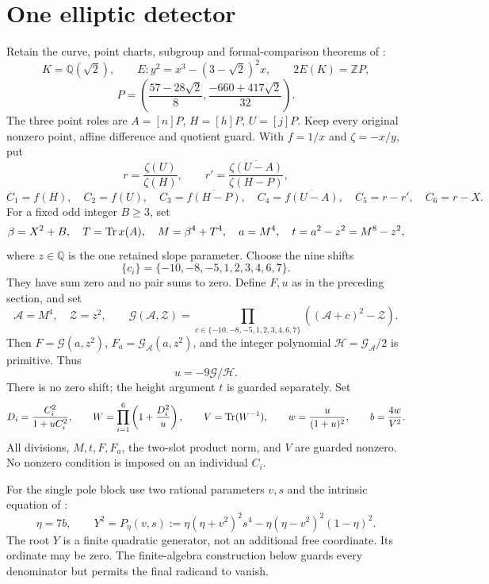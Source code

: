 \documentclass[11pt,a4paper]{article}
\newcommand{\Q}{\mathbb Q}\newcommand{\Z}{\mathbb Z}
\begin{document}
\section{One elliptic detector}

Retain the curve, point charts, subgroup and formal-comparison theorems
of \cite{Conditional,Unit}:
\[
 K=\Q(\sqrt2),\qquad E:y^2=x^3-(3-\sqrt2)^2x,\qquad
 2E(K)=\Z P,
\]
\[
 P=\left(\frac{57-28\sqrt2}{8},
          \frac{-660+417\sqrt2}{32}\right).
\]
The three point roles are $A=[n]P$, $H=[h]P$, $U=[j]P$.
Keep every original nonzero point, affine difference and quotient guard.
With $f=1/x$ and $\zeta=-x/y$, put
\[
 r=\frac{\zeta(U)}{\zeta(H)},\qquad
 r'=\overline{\frac{\zeta(U-A)}{\zeta(H-P)}},
\]
\[
 C_1=f(H),\quad C_2=f(U),\quad
 C_3=\overline{f(H-P)},\quad C_4=\overline{f(U-A)},\quad
 C_5=r-r',\quad C_6=r-X.
\]
For a fixed odd integer $B\ge3$, set
\begin{equation}\label{eq:scale}
 \beta=X^2+B,\quad T=\operatorname{Tr} x(A),\quad
 M=\beta^4+T^4,\quad a=M^4,\quad t=a^2-z^2=M^8-z^2,
\end{equation}
where $z\in\Q$ is the one retained slope parameter.
Choose the nine shifts
\[
                  \{c_i\}=\{-10,-8,-5,1,2,3,4,6,7\}.
\]
They have sum zero and no pair sums to zero.
Define $F,u$ as in the preceding section, and set
\begin{equation}\label{eq:squared-expression}
 \mathcal A=M^4,\quad \mathcal Z=z^2,\qquad
 \mathcal G(\mathcal A,\mathcal Z)=
 \prod_{c\in\{-10,-8,-5,1,2,3,4,6,7\}}
                    ((\mathcal A+c)^2-\mathcal Z).
\end{equation}
Then $F=\mathcal G(a,z^2)$, $F_a=\mathcal G_{\mathcal A}(a,z^2)$,
and the integer polynomial
$\mathcal H=\mathcal G_{\mathcal A}/2$ is primitive. Thus
\[
                            u=-9\mathcal G/\mathcal H.
\]
There is no zero shift; the height argument $t$ is guarded separately.
Set
\begin{equation}\label{eq:balanced}
 D_i=\frac{C_i^2}{1+uC_i^2},\qquad
 W=\prod_{i=1}^6\left(1+\frac{D_i^2}{u}\right),\qquad
 V=\operatorname{Tr}(W^{-1}),\qquad
 w=\frac{u}{(1+u)^2},\qquad b=\frac{4w}{V^2}.
\end{equation}
All divisions, $M,t,F,F_a$, the two-slot product norm, and $V$ are
guarded nonzero. No nonzero condition is imposed on an individual $C_i$.

For the single pole block use two rational parameters $v,s$ and the
intrinsic equation of \cite{Intrinsic}:
\begin{equation}\label{eq:pole}
 \eta=7b,\qquad
 Y^2=P_\eta(v,s):=
 \eta(\eta+v^2)^2s^4-\eta(\eta-v^2)^2(1-\eta)^2.
\end{equation}
The root $Y$ is a finite quadratic generator, not an additional free
coordinate. Its ordinate may be zero. The finite-algebra construction below
guards every denominator but permits the final radicand to vanish.
\end{document}
